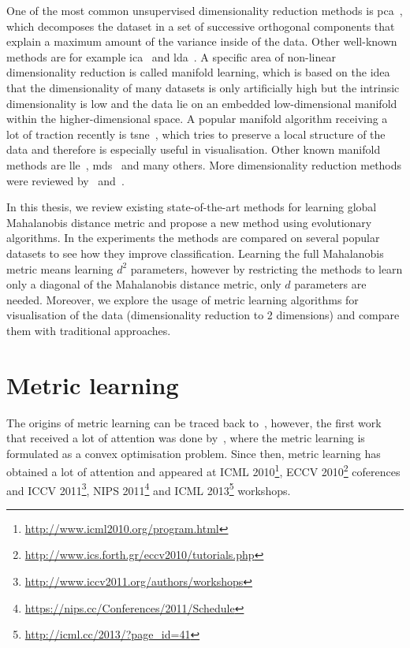 \documentclass[12pt,a4paper]{report}
\begin{document}
One of the most common unsupervised dimensionality reduction methods is \ac{pca}~\citep{jolliffe2002principal}, which decomposes the dataset in a set of successive orthogonal components that explain a maximum amount of the variance inside of the data. Other well-known methods are for example \ac{ica}~\citep{comon1994independent} and \ac{lda}~\citep{fisher1936use}. A specific area of non-linear dimensionality reduction is called manifold learning, which is based on the idea that the dimensionality of many datasets is only artificially high but the intrinsic dimensionality is low and the data lie on an embedded low-dimensional manifold within the higher-dimensional space. A popular manifold algorithm receiving a lot of traction recently is \ac{tsne}~\citep{maaten2008visualizing}, which tries to preserve a local structure of the data and therefore is especially useful in visualisation. Other known manifold methods are \ac{lle}~\citep{roweis2000nonlinear}, \ac{mds}~\citep{kruskal1978multidimensional} and many others. More dimensionality reduction methods were reviewed by~\citep{fodor2002survey} and~\citep{van2009dimensionality}.

In this thesis, we review existing state-of-the-art methods for learning global Mahalanobis distance metric and propose a new method using evolutionary algorithms. In the experiments the methods are compared on several popular datasets to see how they improve classification. Learning the full Mahalanobis metric means learning $d^2$ parameters, however by restricting the methods to learn only a diagonal of the Mahalanobis distance metric, only $d$ parameters are needed. Moreover, we explore the usage of metric learning algorithms for visualisation of the data (dimensionality reduction to 2 dimensions) and compare them with traditional approaches.

\section{Metric learning} \label{chap:intro:ml}

The origins of metric learning can be traced back to~\citep{short1981optimal}, however, the first work that received a lot of attention was done by~\citep{xing2002distance}, where the metric learning is formulated as a convex optimisation problem. Since then, metric learning has obtained a lot of attention and appeared at ICML 2010\footnote{\url{http://www.icml2010.org/program.html}}, ECCV 2010\footnote{\url{http://www.ics.forth.gr/eccv2010/tutorials.php}} coferences and ICCV 2011\footnote{\url{http://www.iccv2011.org/authors/workshops}}, NIPS 2011\footnote{\url{https://nips.cc/Conferences/2011/Schedule}} and ICML 2013\footnote{\url{http://icml.cc/2013/?page_id=41}} workshops.
\end{document}
